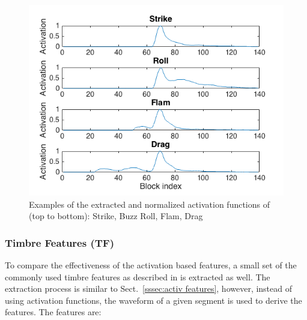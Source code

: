 \documentclass{article}
\begin{document}



\begin{figure}
\centering
\includegraphics[width = 8 cm]{./figures/activ_all.png}
\caption{Examples of the extracted and normalized activation functions of (top to bottom): Strike, Buzz Roll, Flam, Drag}
\label{fig:atvall}
\end{figure}

\subsubsection{Timbre Features (TF)}
\label{sssec:timbre features}
To compare the effectiveness of the activation based features, a small set of the commonly used timbre features as described in \cite{Lerch2012} is extracted as well. The extraction process is similar to Sect.~\ref{sssec:activ features}, however, instead of using activation functions, the waveform of a given segment is used to derive the features. The features are: 
\end{document}
